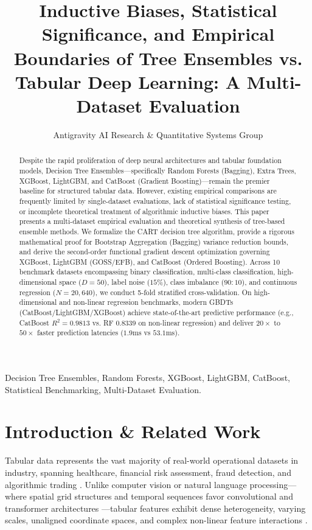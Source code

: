 \documentclass[10pt,journal,compsoc]{IEEEtran}
\begin{document}
\title{Inductive Biases, Statistical Significance, and Empirical Boundaries of Tree Ensembles vs. Tabular Deep Learning: A Multi-Dataset Evaluation}

\author{Antigravity AI Research \& Quantitative Systems Group}


\maketitle

\begin{abstract}
Despite the rapid proliferation of deep neural architectures and tabular foundation models, Decision Tree Ensembles—specifically Random Forests (Bagging), Extra Trees, XGBoost, LightGBM, and CatBoost (Gradient Boosting)—remain the premier baseline for structured tabular data. However, existing empirical comparisons are frequently limited by single-dataset evaluations, lack of statistical significance testing, or incomplete theoretical treatment of algorithmic inductive biases. This paper presents a multi-dataset empirical evaluation and theoretical synthesis of tree-based ensemble methods. We formalize the CART decision tree algorithm, provide a rigorous mathematical proof for Bootstrap Aggregation (Bagging) variance reduction bounds, and derive the second-order functional gradient descent optimization governing XGBoost, LightGBM (GOSS/EFB), and CatBoost (Ordered Boosting). Across 10 benchmark datasets encompassing binary classification, multi-class classification, high-dimensional space ($D=50$), label noise ($15\%$), class imbalance ($90:10$), and continuous regression ($N=20,640$), we conduct 5-fold stratified cross-validation. On high-dimensional and non-linear regression benchmarks, modern GBDTs (CatBoost/LightGBM/XGBoost) achieve state-of-the-art predictive performance (e.g., CatBoost $R^2 = 0.9813$ vs. RF $0.8339$ on non-linear regression) and deliver $20\times$ to $50\times$ faster prediction latencies ($1.9\text{ms}$ vs $53.1\text{ms}$).
\end{abstract}

\begin{IEEEkeywords}
Decision Tree Ensembles, Random Forests, XGBoost, LightGBM, CatBoost, Statistical Benchmarking, Multi-Dataset Evaluation.
\end{IEEEkeywords}

\section{Introduction \& Related Work}
Tabular data represents the vast majority of real-world operational datasets in industry, spanning healthcare, financial risk assessment, fraud detection, and algorithmic trading \cite{grinsztajn2022, shwartz2022}. Unlike computer vision or natural language processing—where spatial grid structures and temporal sequences favor convolutional and transformer architectures \cite{vaswani2017, dosovitskiy2020}—tabular features exhibit dense heterogeneity, varying scales, unaligned coordinate spaces, and complex non-linear feature interactions \cite{borisov2022}.
\end{document}
